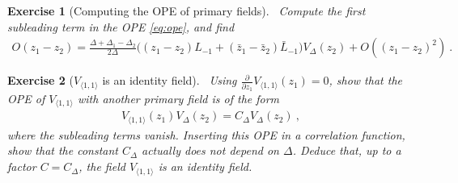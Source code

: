 \documentclass[12pt, a4paper]{article}
\theoremstyle{break}
\newtheorem{exo}{Exercise}[section]
\begin{document}
\begin{exo}[Computing the OPE of primary fields]
~\label{exo:ope}
 Compute the first subleading term in the OPE \eqref{eq:ope}, and find
 \begin{align}
  O(z_1-z_2) = \frac{\Delta+\Delta_1-\Delta_2}{2\Delta} \Big( (z_1-z_2)L_{-1}+(\bar z_1-\bar z_2)\bar L_{-1}\Big) V_{\Delta}(z_2) + O((z_1-z_2)^2)\ .
 \end{align}
\end{exo}

\begin{exo}[$V_{\langle 1,1\rangle}$ is an identity field]
~\label{exo:id}
Using $\frac{\partial}{\partial z_1} V_{\langle 1,1\rangle}(z_1)=0$, show that the OPE of $V_{\langle 1,1\rangle}$ with another primary field is of the form 
\begin{align}
 V_{\langle 1,1\rangle}(z_1)V_\Delta(z_2) = C_\Delta V_\Delta(z_2)\ ,
\end{align}
where the subleading terms vanish. Inserting this OPE in a correlation function, show that the constant $C_\Delta$ actually does not depend on $\Delta$. Deduce that, up to a factor $C=C_\Delta$, the field $V_{\langle 1,1\rangle}$ is an identity field.
\end{exo}
\end{document}
